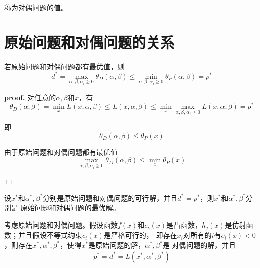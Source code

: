 称为对偶问题的值。

\section{原始问题和对偶问题的关系}

\begin{theorem}
    若原始问题和对偶问题都有最优值，则
    \begin{equation}
        d^*=\max\limits_{\alpha,\beta,\alpha_i\geqslant 0} \theta_D(\alpha,\beta)
        \leqslant \min\limits_{\alpha,\beta,\alpha_i\geqslant 0} \theta_P(\alpha,\beta)=p^*
    \end{equation}
\end{theorem}

\textbf{proof. } 对任意的$\alpha,\beta$和$x$，有
\begin{equation}
    \theta_D(\alpha,\beta)=\min\limits_{x}L(x,\alpha,\beta)\leqslant L(x,\alpha,\beta)
    \leqslant \min\limits_{x}\max\limits_{\alpha,\beta,\alpha_i\geqslant 0}L(x,\alpha,\beta)=p^*
\end{equation}

即
\begin{equation}
    \theta_D(\alpha,\beta)\leqslant \theta_P(x)
\end{equation}

由于原始问题和对偶问题都有最优值
\begin{equation}
    \max\limits_{\alpha,\beta,\alpha_i\geqslant 0}\theta_D(\alpha,\beta)\leqslant \min\limits_{x}\theta_P(x)
\end{equation}

$\Box$

\begin{corollary}
    设$x^*$和$\alpha^*,\beta^*$分别是原始问题和对偶问题的可行解，并且$d^*=p^*$，则$x^*$和$\alpha^*,\beta^*$分别是
    原始问题和对偶问题的最优解。
\end{corollary}

\begin{theorem}
    考虑原始问题和对偶问题。假设函数$f(x)$和$c_i(x)$是凸函数，$h_j(x)$是仿射函数；并且假设不等式约束$c_i(x)$是严格可行的，
    即存在$x_i$对所有的$i$有$c_i(x)<0$，则存在$x^*,\alpha^*,\beta^*$，使得$x^*$是原始问题的解，$\alpha^*,\beta^*$是
    对偶问题的解，并且
    \begin{equation}
        p^*=d^*=L(x^*,\alpha^*,\beta^*)
    \end{equation}
\end{theorem}

